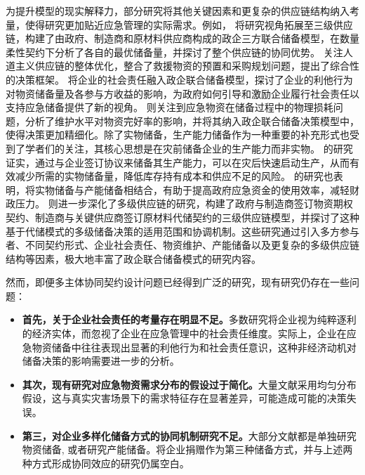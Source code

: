 \documentclass[a4paper,8pt,twocolumn]{article} %
\begin{document}
为提升模型的现实解释力，部分研究将其他关键因素和更复杂的供应链结构纳入考量，使得研究更加贴近应急管理的实际需求。例如，\parencite{Gong2024Quantity} 将研究视角拓展至三级供应链，构建了由政府、制造商和原材料供应商构成的政企三方联合储备模型，在数量柔性契约下分析了各自的最优储备量，并探讨了整个供应链的协同优势。\parencite{torabi2018integrated} 关注人道主义供应链的整体优化，整合了救援物资的预置和采购规划问题，提出了综合性的决策框架。\parencite{zhengh2023} 将企业的社会责任融入政企联合储备模型，探讨了企业的利他行为对物资储备量及各参与方收益的影响，为政府如何引导和激励企业履行社会责任以支持应急储备提供了新的视角。\parencite{wang2023考虑维护水平} 则关注到应急物资在储备过程中的物理损耗问题，分析了维护水平对物资完好率的影响，并将其纳入政企联合储备决策模型中，使得决策更加精细化。除了实物储备，生产能力储备作为一种重要的补充形式也受到了学者们的关注，其核心思想是在灾前储备企业的生产能力而非实物。\parencite{hu2018考虑企业生产能力} 的研究证实，通过与企业签订协议来储备其生产能力，可以在灾后快速启动生产，从而有效减少所需的实物储备量，降低库存持有成本和供应不足的风险。\parencite{zhang2016emergency} 的研究也表明，将实物储备与产能储备相结合，有助于提高政府应急资金的使用效率，减轻财政压力。\parencite{jiang2024基于代储模式} 则进一步深化了多级供应链的研究，构建了政府与制造商签订物资期权契约、制造商与关键供应商签订原材料代储契约的三级供应链模型，并探讨了这种基于代储模式的多级储备决策的适用范围和协调机制。这些研究通过引入多方参与者、不同契约形式、企业社会责任、物资维护、产能储备以及更复杂的多级供应链结构等因素，极大地丰富了政企联合储备模式的研究内容。

然而，即便多主体协同契约设计问题已经得到广泛的研究，现有研究仍存在一些问题：
\begin{itemize}
    \item \textbf{首先，关于企业社会责任的考量存在明显不足。}多数研究将企业视为纯粹逐利的经济实体\cite{Li2022Stackelberg,Chen2023Contract}，而忽视了企业在应急管理中的社会责任维度。实际上，企业在应急物资储备中往往表现出显著的利他行为和社会责任意识\cite{zhengh2023}，这种非经济动机对储备决策的影响需要进一步的分析。
    \item \textbf{其次，现有研究对应急物资需求分布的假设过于简化。}大量文献采用均匀分布假设\cite{chai2021考虑储备周期,chen2014突发事件灾前应急物资政企联合储备模式}，这与真实灾害场景下的需求特征存在显著差异，可能造成可能的决策失误。
    \item \textbf{第三，对企业多样化储备方式的协同机制研究不足。}大部分文献都是单独研究物资储备\cite{Li2022Stackelberg, li2022政企联合储备,Chen2023Contract}, 或者研究产能储备\cite{Gong2024Quantity}。将企业捐赠作为第三种储备方式，并与上述两种方式形成协同效应的研究仍属空白。
\end{itemize}
\end{document}
